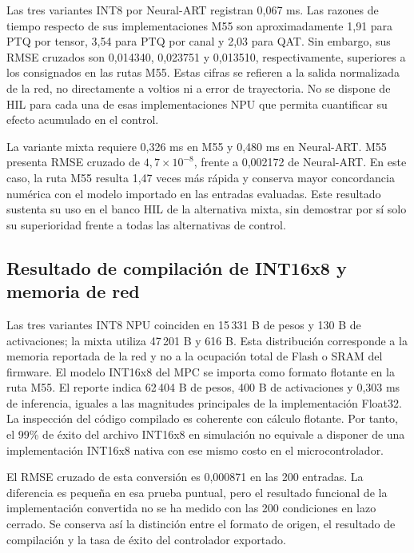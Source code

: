 Las tres variantes INT8 por Neural-ART registran 0,067 ms. Las razones de tiempo respecto de sus implementaciones M55 son aproximadamente 1,91 para PTQ por tensor, 3,54 para PTQ por canal y 2,03 para QAT. Sin embargo, sus RMSE cruzados son 0,014340, 0,023751 y 0,013510, respectivamente, superiores a los consignados en las rutas M55. Estas cifras se refieren a la salida normalizada de la red, no directamente a voltios ni a error de trayectoria. No se dispone de HIL para cada una de esas implementaciones NPU que permita cuantificar su efecto acumulado en el control.

La variante mixta requiere 0,326 ms en M55 y 0,480 ms en Neural-ART. M55 presenta RMSE cruzado de $4{,}7\times10^{-8}$, frente a 0,002172 de Neural-ART. En este caso, la ruta M55 resulta 1,47 veces más rápida y conserva mayor concordancia numérica con el modelo importado en las entradas evaluadas. Este resultado sustenta su uso en el banco HIL de la alternativa mixta, sin demostrar por sí solo su superioridad frente a todas las alternativas de control.

\FloatBarrier
\subsection{Resultado de compilación de INT16x8 y memoria de red}

Las tres variantes INT8 NPU coinciden en 15\,331 B de pesos y 130 B de activaciones; la mixta utiliza 47\,201 B y 616 B. Esta distribución corresponde a la memoria reportada de la red y no a la ocupación total de Flash o SRAM del firmware.
El modelo INT16x8 del MPC se importa como formato flotante en la ruta M55. El reporte indica 62\,404 B de pesos, 400 B de activaciones y 0,303 ms de inferencia, iguales a las magnitudes principales de la implementación Float32. La inspección del código compilado es coherente con cálculo flotante. Por tanto, el 99\% de éxito del archivo INT16x8 en simulación no equivale a disponer de una implementación INT16x8 nativa con ese mismo costo en el microcontrolador.

El RMSE cruzado de esta conversión es 0,000871 en las 200 entradas. La diferencia es pequeña en esa prueba puntual, pero el resultado funcional de la implementación convertida no se ha medido con las 200 condiciones en lazo cerrado. Se conserva así la distinción entre el formato de origen, el resultado de compilación y la tasa de éxito del controlador exportado.

